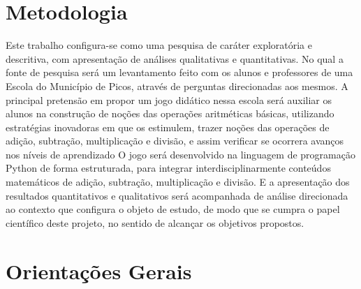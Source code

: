 \documentclass[a4paper,12pt]{article}
\begin{document}
\section{Metodologia}
\label{sc:metodologia}
Este trabalho configura-se como uma pesquisa de caráter exploratória e descritiva, com apresentação de análises qualitativas e quantitativas. No qual a fonte de pesquisa será um levantamento feito com os alunos e professores de uma Escola do Município de Picos, através de perguntas direcionadas aos mesmos.
A principal pretensão em propor um jogo didático nessa escola será auxiliar os alunos na construção de noções das operações aritméticas básicas, utilizando estratégias inovadoras em que os estimulem, trazer noções das operações de adição, subtração, multiplicação e divisão, e assim verificar se ocorrera avanços nos níveis de aprendizado
	O jogo será desenvolvido na linguagem de programação Python de forma estruturada, para integrar interdisciplinarmente conteúdos matemáticos de adição, subtração, multiplicação e divisão. E a apresentação dos resultados quantitativos e qualitativos será acompanhada de análise direcionada ao contexto que configura o objeto de estudo, de modo que se cumpra o papel científico deste projeto, no sentido de alcançar os objetivos propostos.




%

%



\newpage
\section{Orientações Gerais}
\end{document}
